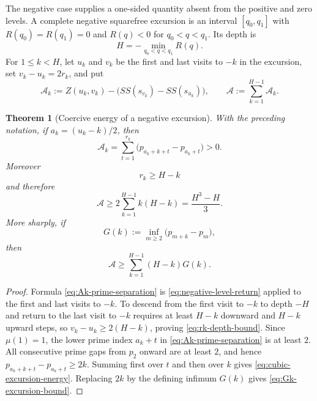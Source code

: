 \documentclass[11pt]{amsart}
\numberwithin{equation}{section}
\theoremstyle{plain}
\newtheorem{theorem}{Theorem}[section]
\theoremstyle{definition}
\theoremstyle{remark}
\begin{document}
The negative case supplies a one-sided quantity absent from the positive and
zero levels.  A complete negative squarefree excursion is an interval
$[q_0,q_1]$ with $R(q_0)=R(q_1)=0$ and $R(q)<0$ for
$q_0<q<q_1$.  Its depth is
\begin{equation}
\label{eq:negative-excursion-depth}
H=-\min_{q_0<q<q_1}R(q).
\end{equation}
For $1\le k<H$, let $u_k$ and $v_k$ be the first and last visits to $-k$ in
the excursion, set $v_k-u_k=2r_k$, and put
\begin{equation}
\label{eq:Ak-definition}
\mathcal A_k
:=Z(u_k,v_k)-\bigl(SS(s_{v_k})-SS(s_{u_k})\bigr),
\qquad
\mathcal A:=\sum_{k=1}^{H-1}\mathcal A_k.
\end{equation}

\begin{theorem}[Coercive energy of a negative excursion]
\label{thm:negative-excursion-energy}
With the preceding notation, if
$a_k=(u_k-k)/2$, then
\begin{equation}
\label{eq:Ak-prime-separation}
\boxed{
\mathcal A_k
=\sum_{t=1}^{r_k}\bigl(p_{a_k+k+t}-p_{a_k+t}\bigr)>0.}
\end{equation}
Moreover
\begin{equation}
\label{eq:rk-depth-bound}
r_k\ge H-k
\end{equation}
and therefore
\begin{equation}
\label{eq:cubic-excursion-energy}
\boxed{
\mathcal A\ge 2\sum_{k=1}^{H-1}k(H-k)
=\frac{H^3-H}{3}.}
\end{equation}
More sharply, if
\begin{equation}
\label{eq:Gk-definition}
G(k):=\inf_{m\ge2}\bigl(p_{m+k}-p_m\bigr),
\end{equation}
then
\begin{equation}
\label{eq:Gk-excursion-bound}
\mathcal A\ge\sum_{k=1}^{H-1}(H-k)G(k).
\end{equation}
\end{theorem}

\begin{proof}
Formula \eqref{eq:Ak-prime-separation} is
\eqref{eq:negative-level-return} applied to the first and last visits to
$-k$.  To descend from the first visit to $-k$ to depth $-H$ and return to the
last visit to $-k$ requires at least $H-k$ downward and $H-k$ upward steps, so
$v_k-u_k\ge2(H-k)$, proving \eqref{eq:rk-depth-bound}.  Since $\mu(1)=1$, the
lower prime index $a_k+t$ in \eqref{eq:Ak-prime-separation} is at least $2$.
All consecutive prime gaps from $p_2$ onward are at least $2$, and hence
$p_{a_k+k+t}-p_{a_k+t}\ge2k$.  Summing first over $t$ and then over $k$ gives
\eqref{eq:cubic-excursion-energy}.  Replacing $2k$ by the defining infimum
$G(k)$ gives \eqref{eq:Gk-excursion-bound}.
\end{proof}
\end{document}
